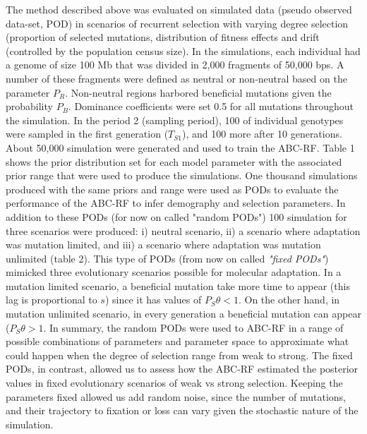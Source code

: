 \documentclass[12pt]{article}
\begin{document}
The method described above was evaluated on simulated data (pseudo observed data-set, POD) in scenarios of recurrent selection with varying degree selection (proportion of selected mutations, distribution of fitness effects and drift (controlled by the population census size). In the simulations, each individual had a genome of size 100 Mb that was divided in 2,000 fragments of 50,000 bps. A number of these fragments were defined as neutral or non-neutral based on the parameter $P_{R}$. Non-neutral regions harbored beneficial mutations given the probability $P_{B}$. Dominance coefficients were set 0.5 for all mutations throughout the simulation. In the period 2 (sampling period), 100 of individual genotypes were sampled in the first generation ($T_{S1}$), and 100 more after 10 generations. About 50,000 simulation were generated and used to train the ABC-RF. Table 1 shows the prior distribution set for each model parameter with the associated prior range that were used to produce the simulations. One thousand simulations produced with the same priors and range were used as PODs to evaluate the performance of the ABC-RF to infer demography and selection parameters. In addition to these PODs (for now on called "random PODs") 100 simulation for three scenarios were produced:  i) neutral scenario, ii) a scenario where adaptation was mutation limited, and iii) a scenario where adaptation was mutation unlimited (table 2). This type of PODs (from now on called \textit{"fixed PODs"})  mimicked three evolutionary scenarios possible for molecular adaptation. In a mutation limited scenario, a beneficial mutation take more time to appear (this lag is proportional to $s$) since it has values of $P_{S}\theta < 1$. On the other hand, in mutation unlimited scenario, in every generation a beneficial mutation can appear ($P_{S}\theta > 1$. In summary, the random PODs were used to ABC-RF in a range of possible combinations of parameters and parameter space to approximate what could happen when the degree of selection range from weak to strong. The fixed PODs, in contrast, allowed us to assess how the ABC-RF estimated the posterior values in fixed evolutionary scenarios of weak vs strong selection. Keeping the parameters fixed allowed us add random noise, since the number of mutations, and their trajectory to fixation or loss can vary given the stochastic nature of the simulation.
\end{document}
